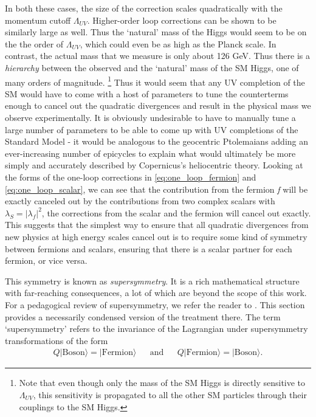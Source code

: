 \strictpagecheck
In both these cases, the size of the correction scales quadratically with the momentum cutoff $\Lambda_{UV}$. Higher-order loop corrections can be shown to be similarly large as well. Thus the `natural' mass of the Higgs would seem to be on the the order of $\Lambda_{UV}$, which could even be as high as the Planck scale. In contrast, the actual mass that we measure is only about 126 GeV. Thus there is a \emph{hierarchy} between the observed and the `natural' mass of the SM Higgs, one of many orders of magnitude. \footnote{Note that even though only the mass of the SM Higgs is directly sensitive to $\Lambda_{UV}$, this sensitivity is propagated to all the other SM particles through their couplings to the SM Higgs.}
Thus it would seem that any UV completion of the SM would have to come with a host of parameters to tune the counterterms enough to cancel out the quadratic divergences and result in the physical mass we observe experimentally.
It is obviously undesirable to have to manually tune a large number of parameters to be able to come up with UV completions of the Standard Model - it would be analogous to the geocentric Ptolemaians adding an ever-increasing number of epicycles to explain what would ultimately be more simply and accurately described by Copernicus's heliocentric theory. 
Looking at the forms of the one-loop corrections in \eqref{eq:one_loop_fermion} and \eqref{eq:one_loop_scalar}, we can see that the contribution from the fermion \emph{f} will be exactly canceled out by the contributions from two complex scalars with $\lambda_S = |\lambda_f|^2$, the corrections from the scalar and the fermion will cancel out exactly. This suggests that the simplest way to ensure that all quadratic divergences from new physics at high energy scales cancel out is to require some kind of symmetry between fermions and scalars, ensuring that there is a scalar partner for each fermion, or vice versa.

This symmetry is known as \emph{supersymmetry}. It is a rich mathematical structure with far-reaching consequences, a lot of which are beyond the scope of this work. For a pedagogical review of supersymmetry, we refer the reader to \citep{Martin1997}. This section provides a necessarily condensed version of the treatment there. 
The term `supersymmetry' refers to the invariance of the Lagrangian under supersymmetry transformations of the form
\begin{align*}
  Q|\text{Boson}\rangle = |\text{Fermion}\rangle &&\text{and}&& Q|\text{Fermion}\rangle = |\text{Boson}\rangle.
\end{align*}

